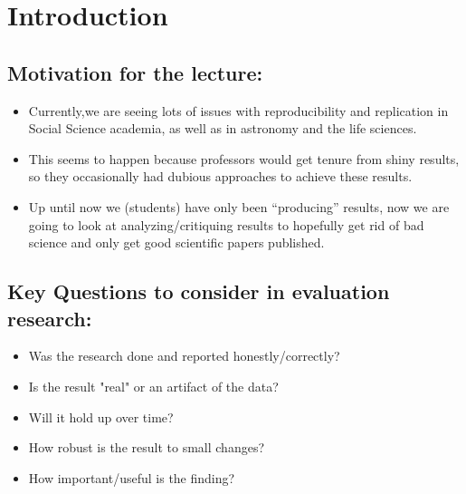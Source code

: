 
\section{Introduction}
\subsection{Motivation for the lecture:}
\begin{itemize}
    \item{Currently,we are seeing lots of issues with reproducibility and replication in Social Science academia, as well as in astronomy and the life sciences.}
    
    \item{This seems to happen because professors would get tenure from shiny results, so they occasionally had dubious approaches to achieve these results.}
    
     \item {Up until now we (students) have only been “producing” results, now we are going to look at analyzing/critiquing results to hopefully get rid of bad science and only get good scientific papers published.}

\end{itemize} 

\subsection{Key Questions to consider in evaluation research:}

\begin{itemize}
    \item{Was the research done and reported honestly/correctly?}
    
    \item{Is the result "real" or an artifact of the data?}
    
    \item {Will it hold up over time?}
    
    \item {How robust is the result to small changes?}
 
    \item {How important/useful is the finding?\\}

\end{itemize} 

